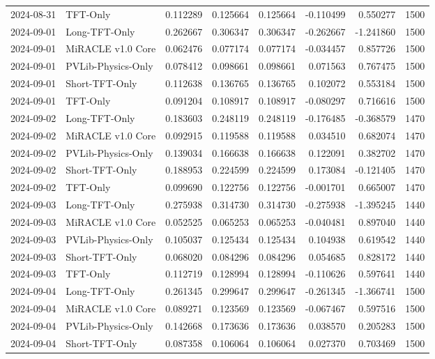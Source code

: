 \begin{tabular}{llrrrrrr}
2024-08-31 & TFT-Only & 0.112289 & 0.125664 & 0.125664 & -0.110499 & 0.550277 & 1500 \\
2024-09-01 & Long-TFT-Only & 0.262667 & 0.306347 & 0.306347 & -0.262667 & -1.241860 & 1500 \\
2024-09-01 & MiRACLE v1.0 Core & 0.062476 & 0.077174 & 0.077174 & -0.034457 & 0.857726 & 1500 \\
2024-09-01 & PVLib-Physics-Only & 0.078412 & 0.098661 & 0.098661 & 0.071563 & 0.767475 & 1500 \\
2024-09-01 & Short-TFT-Only & 0.112638 & 0.136765 & 0.136765 & 0.102072 & 0.553184 & 1500 \\
2024-09-01 & TFT-Only & 0.091204 & 0.108917 & 0.108917 & -0.080297 & 0.716616 & 1500 \\
2024-09-02 & Long-TFT-Only & 0.183603 & 0.248119 & 0.248119 & -0.176485 & -0.368579 & 1470 \\
2024-09-02 & MiRACLE v1.0 Core & 0.092915 & 0.119588 & 0.119588 & 0.034510 & 0.682074 & 1470 \\
2024-09-02 & PVLib-Physics-Only & 0.139034 & 0.166638 & 0.166638 & 0.122091 & 0.382702 & 1470 \\
2024-09-02 & Short-TFT-Only & 0.188953 & 0.224599 & 0.224599 & 0.173084 & -0.121405 & 1470 \\
2024-09-02 & TFT-Only & 0.099690 & 0.122756 & 0.122756 & -0.001701 & 0.665007 & 1470 \\
2024-09-03 & Long-TFT-Only & 0.275938 & 0.314730 & 0.314730 & -0.275938 & -1.395245 & 1440 \\
2024-09-03 & MiRACLE v1.0 Core & 0.052525 & 0.065253 & 0.065253 & -0.040481 & 0.897040 & 1440 \\
2024-09-03 & PVLib-Physics-Only & 0.105037 & 0.125434 & 0.125434 & 0.104938 & 0.619542 & 1440 \\
2024-09-03 & Short-TFT-Only & 0.068020 & 0.084296 & 0.084296 & 0.054685 & 0.828172 & 1440 \\
2024-09-03 & TFT-Only & 0.112719 & 0.128994 & 0.128994 & -0.110626 & 0.597641 & 1440 \\
2024-09-04 & Long-TFT-Only & 0.261345 & 0.299647 & 0.299647 & -0.261345 & -1.366741 & 1500 \\
2024-09-04 & MiRACLE v1.0 Core & 0.089271 & 0.123569 & 0.123569 & -0.067467 & 0.597516 & 1500 \\
2024-09-04 & PVLib-Physics-Only & 0.142668 & 0.173636 & 0.173636 & 0.038570 & 0.205283 & 1500 \\
2024-09-04 & Short-TFT-Only & 0.087358 & 0.106064 & 0.106064 & 0.027370 & 0.703469 & 1500 \\

\end{tabular}
